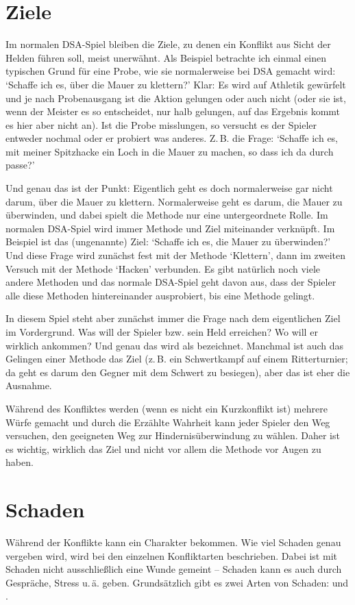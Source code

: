 \section{Ziele}
Im normalen DSA-Spiel bleiben die Ziele, zu denen ein Konflikt aus Sicht der Helden führen soll, meist unerwähnt. Als Beispiel betrachte ich einmal einen typischen Grund für eine Probe, wie sie normalerweise bei DSA gemacht wird: `Schaffe ich es, über die Mauer zu klettern?' Klar: Es wird auf Athletik gewürfelt und je nach Probenausgang ist die Aktion gelungen oder auch nicht (oder sie ist, wenn der Meister es so entscheidet, nur halb gelungen, auf das Ergebnis kommt es hier aber nicht an). Ist die Probe misslungen, so versucht es der Spieler entweder nochmal oder er probiert was anderes. Z.\,B. die Frage: `Schaffe ich es, mit meiner Spitzhacke ein Loch in die Mauer zu machen, so dass ich da durch passe?'

Und genau das ist der Punkt: Eigentlich geht es doch normalerweise gar nicht darum, über die Mauer zu klettern. Normalerweise geht es darum, die Mauer zu überwinden, und dabei spielt die Methode nur eine untergeordnete Rolle. Im normalen DSA-Spiel wird immer Methode und Ziel miteinander verknüpft. Im Beispiel ist das (ungenannte) Ziel: `Schaffe ich es, die Mauer zu überwinden?' Und diese Frage wird zunächst fest mit der Methode `Klettern', dann im zweiten Versuch mit der Methode `Hacken' verbunden. Es gibt natürlich noch viele andere Methoden und das normale DSA-Spiel geht davon aus, dass der Spieler alle diese Methoden hintereinander ausprobiert, bis eine Methode gelingt.

In diesem Spiel steht aber zunächst immer die Frage nach dem eigentlichen Ziel im Vordergrund. Was will der Spieler bzw. sein Held erreichen? Wo will er wirklich ankommen? Und genau das wird als  bezeichnet. Manchmal ist auch das Gelingen einer Methode das Ziel (z.\,B. ein Schwertkampf auf einem Ritterturnier; da geht es darum den Gegner mit dem Schwert zu besiegen), aber das ist eher die Ausnahme.

Während des Konfliktes werden (wenn es nicht ein Kurzkonflikt ist) mehrere Würfe gemacht und durch die Erzählte Wahrheit kann jeder Spieler den Weg versuchen, den geeigneten Weg zur Hindernisüberwindung zu wählen. Daher ist es wichtig, wirklich das Ziel und nicht vor allem die Methode vor Augen zu haben.

\section{Schaden}\label{Schaden}
Während der Konflikte kann ein Charakter  bekommen. Wie viel Schaden genau vergeben wird, wird bei den einzelnen Konfliktarten beschrieben. Dabei ist mit Schaden nicht ausschließlich eine Wunde gemeint -- Schaden kann es auch durch Gespräche, Stress u.\,ä. geben. Grundsätzlich gibt es zwei Arten von Schaden:  und .

